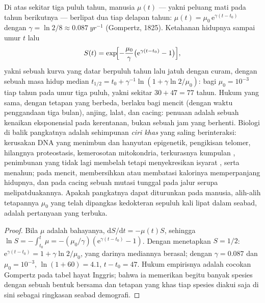 \begin{proposition}\label{prop:b3:stem-cells:gompertz}
%
Di atas sekitar tiga puluh tahun,  manusia $\mu(t)$ --- yakni peluang
mati pada tahun berikutnya --- berlipat dua tiap delapan tahun: $\mu(t) =
\mu_{0}\,\mathrm{e}^{\gamma(t - t_{0})}$ dengan $\gamma = \ln 2/8 \approx
\qty{0.087}{yr^{-1}}$ (Gompertz, 1825). Ketahanan hidupnya sampai umur $t$ lalu
\[
S(t) = \exp\!\Bigl[-\frac{\mu_{0}}{\gamma}\bigl(\mathrm{e}^{\gamma(t - t_{0})} - 1\bigr)\Bigr],
\]
yakni sebuah kurva yang datar berpuluh tahun lalu jatuh dengan curam, dengan sebuah
masa hidup median $t_{1/2} = t_{0} + \gamma^{-1}\ln(1 + \gamma\ln 2/\mu_{0})$:
bagi $\mu_{0} = 10^{-3}$ tiap tahun pada umur tiga puluh, yakni sekitar $30 + 47 = 77$ tahun.
Hukum yang sama, dengan tetapan yang berbeda, berlaku bagi mencit (dengan waktu penggandaan
tiga bulan), anjing, lalat, dan cacing: penuaan adalah sebuah kenaikan eksponensial pada
kerentanan, bukan sebuah jam yang berhenti. Biologi di balik pangkatnya
adalah sehimpunan \emph{ciri khas} yang saling berinteraksi: kerusakan DNA yang menimbun dan
hanyutan epigenetik, pengikisan telomer, hilangnya proteostasis,
kemerosotan mitokondria, terkurasnya kumpulan , penimbunan
\emph{} yang tidak lagi membelah tetapi menyekresikan isyarat
, serta  menahun; pada mencit, membersihkan
 atau membatasi kalorinya memperpanjang hidupnya, dan pada cacing sebuah
mutasi tunggal pada jalur serupa  melipatduakannya. Apakah
pangkatnya dapat diturunkan pada manusia, alih-alih tetapannya $\mu_{0}$
yang telah dipangkas kedokteran sepuluh kali lipat dalam seabad, adalah pertanyaan yang terbuka.
\end{proposition}
\begin{proof}
Bila $\mu$ adalah bahayanya, $\mathrm{d}S/\mathrm{d}t = -\mu(t)S$, sehingga $\ln S =
-\int_{t_{0}}^{t}\mu = -(\mu_{0}/\gamma)(\mathrm{e}^{\gamma(t-t_{0})} -
1)$. Dengan menetapkan $S = 1/2$: $\mathrm{e}^{\gamma(t-t_{0})} = 1 + \gamma\ln 2/
\mu_{0}$, yang darinya mediannya berasal; dengan $\gamma = 0.087$ dan $\mu_{0} =
10^{-3}$, $\ln(1 + 60) = 4.1$, $t - t_{0} = 47$. Hukum empirisnya adalah
cocokan Gompertz pada tabel hayat Inggris; bahwa ia memerikan begitu banyak
spesies dengan sebuah bentuk bersama dan tetapan yang khas tiap spesies diakui saja
di sini sebagai ringkasan seabad demografi.
\end{proof}

